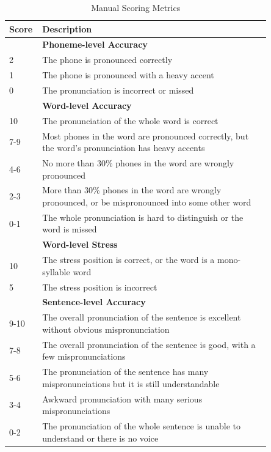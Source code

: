\documentclass[a4paper]{article}
\begin{document}
\begin{table}[t]
  \caption{Manual Scoring Metrics}
  \label{tab:metrics}
  \centering
  \begin{tabular}{p{0.05\linewidth}p{0.8\linewidth}}
    \toprule
    \textbf{Score}   & \textbf{Description} \\
    \hline
    ~                & \textbf{Phoneme-level Accuracy} \\
    2                & The phone is pronounced correctly \\
    1                & The phone is pronounced with a heavy accent \\
    0                & The pronunciation is incorrect or missed \\
    \hline
    ~                & \textbf{Word-level Accuracy} \\
    10               & The pronunciation of the whole word is correct \\
    7-9              & Most phones in the word are pronounced correctly, but the word's pronunciation has heavy accents \\
    4-6              & No more than 30\% phones in the word are wrongly pronounced \\
    2-3              & More than 30\% phones in the word are wrongly pronounced, or be mispronounced into some other word \\
    0-1              & The whole pronunciation is hard to distinguish or the word is missed \\
    \hline
    ~                & \textbf{Word-level Stress} \\
    10               & The stress position is correct, or the word is a mono-syllable word \\
    5                & The stress position is incorrect \\
    \hline
    ~                & \textbf{Sentence-level Accuracy} \\
    9-10             & The overall pronunciation of the sentence is excellent without obvious mispronunciation \\
    7-8              & The overall pronunciation of the sentence is good, with a few mispronunciations \\
    5-6              & The pronunciation of the sentence has many mispronunciations but it is still understandable \\
    3-4              & Awkward pronunciation with many serious mispronunciations \\
    0-2              & The pronunciation of the whole sentence is unable to understand or there is no voice \\

\end{tabular}
\end{table}
\end{document}
